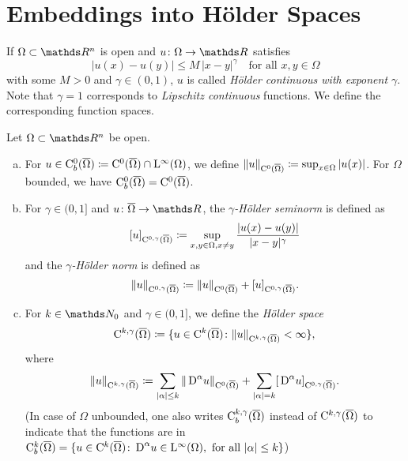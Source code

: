 \section{Embeddings into Hölder Spaces}
\label{sec:hoelderEmbedding}

\setcounter{equation}{11}

If $\Omega \subset \R^n$ is open and $u \colon \Omega \to \R$ satisfies
\begin{equation}
  \label{eq:hoelderCond}
  |u(x) - u(y)| \leq M\, |x - y|^\gamma \quad\text{for all } x, y \in \Omega
\end{equation}
with some $M > 0$ and $\gamma \in (0,1)$, $u$ is called \emph{Hölder continuous with exponent $\gamma$}.
Note that $\gamma = 1$ corresponds to \emph{Lipschitz continuous} functions.
We define the corresponding function spaces.

\begin{defn}
  Let $\Omega \subset \R^n$ be open.
  \begin{enumerate}[a)]
    \item For $u \in \mathrm{C}_b^0(\overline\Omega) \coloneqq \mathrm{C}^0(\overline\Omega) \cap \mathrm{L}^\infty(\Omega)$, we define $\|u\|_{\mathrm{C}^0(\overline\Omega)} \coloneqq \sup_{x \in \Omega} |u(x)|$.
      For $\Omega$ bounded, we have $\mathrm{C}_b^0(\overline\Omega) = \mathrm{C}^0(\overline\Omega)$.

    \item For $\gamma \in (0,1]$ and $u \colon \overline\Omega \to \R$, the \emph{$\gamma$-Hölder seminorm} is defined as
    $$
    [u]_{\mathrm{C}^{0,\gamma}(\overline\Omega)} \coloneqq \sup_{x,y \in \Omega, x \neq y} \frac{|u(x)  - u(y)|}{|x - y|^\gamma}
    $$
    and the \emph{$\gamma$-Hölder norm} is defined as 
    $$
    \|u\|_{\mathrm{C}^{0,\gamma}(\overline\Omega)} \coloneqq \| u\|_{\mathrm{C}^0(\overline\Omega)} + [u]_{\mathrm{C}^{0,\gamma}(\overline\Omega)}.
    $$

    \item For $k \in \N_0$ and $\gamma \in (0,1]$, we define the \emph{Hölder space}
      $$
      \mathrm{C}^{k,\gamma}(\overline\Omega) \coloneqq \{ u \in \mathrm{C}^k(\overline\Omega) \colon \|u\|_{\mathrm{C}^{k,\gamma}(\overline\Omega)} < \infty \},
      $$
      where
      $$
      \| u\|_{\mathrm{C}^{k,\gamma}(\overline\Omega)} \coloneqq \sum_{|\alpha| \leq k} \|\,{\operatorname{D}}^\alpha u\|_{\mathrm{C}^0(\overline\Omega)} + \sum_{|\alpha| = k} [\,{\operatorname{D}}^\alpha u]_{\mathrm{C}^{0,\gamma}(\overline\Omega)}.
      $$
      (In case of $\Omega$ unbounded, one also writes $\mathrm{C}_b^{k,\gamma}(\overline\Omega)$ instead of $\mathrm{C}^{k,\gamma}(\overline\Omega)$ to indicate that the functions are in $\mathrm{C}_b^k(\overline\Omega) = \{ u \in \mathrm{C}^k(\overline\Omega) \colon \,{\operatorname{D}}^\alpha u \in \mathrm{L}^\infty(\Omega), \text{ for all } |\alpha| \leq k \}$)
  \end{enumerate}
\end{defn}

